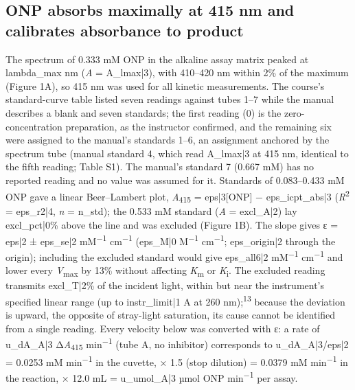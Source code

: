 \documentclass[9pt,twocolumn]{extarticle}
\newcommand{\cit}[1]{\textsuperscript{#1}}
\newcommand{\Km}{\textit{K}\textsubscript{m}}
\newcommand{\Vmax}{\textit{V}\textsubscript{max}}
\newcommand{\Ki}{\textit{K}\textsubscript{i}}
\newcommand{\Rsq}{\textit{R}\textsuperscript{2}}
\newcommand{\Aa}{\textit{A}\textsubscript{415}}
\newcommand{\dAa}{Δ\textit{A}\textsubscript{415}}
\newcommand{\permin}{min\textsuperscript{−1}}
\newcommand{\epsunits}{mM\textsuperscript{−1} cm\textsuperscript{−1}}
\newcommand{\dash}{–}
\begin{document}
\subsection{ONP absorbs maximally at 415 nm and calibrates absorbance to product}
The spectrum of 0.333 mM ONP in the alkaline assay matrix peaked at {{lambda_max}} nm (\textit{A} = {{A_lmax|3}}), with 410\dash 420 nm within 2\% of the maximum (Figure 1A), so 415 nm was used for all kinetic measurements. The course's standard-curve table listed seven readings against tubes 1\dash 7 while the manual describes a blank and seven standards; the first reading (0) is the zero-concentration preparation, as the instructor confirmed, and the remaining six were assigned to the manual's standards 1\dash 6, an assignment anchored by the spectrum tube (manual standard 4, which read {{A_lmax|3}} at 415 nm, identical to the fifth reading; Table S1). The manual's standard 7 (0.667 mM) has no reported reading and no value was assumed for it. Standards of 0.083\dash 0.433 mM ONP gave a linear Beer\dash Lambert plot, \Aa{} = {{eps|3}}[ONP] − {{eps_icpt_abs|3}} (\Rsq{} = {{eps_r2|4}}, \textit{n} = {{n_std}}); the 0.533 mM standard (\textit{A} = {{excl_A|2}}) lay {{excl_pct|0}}\% above the line and was excluded (Figure 1B). The slope gives ε = {{eps|2}} ± {{eps_se|2}} \epsunits{} ({{eps_M|0}} M\textsuperscript{−1} cm\textsuperscript{−1}; {{eps_origin|2}} through the origin); including the excluded standard would give {{eps_all6|2}} \epsunits{} and lower every \Vmax{} by 13\% without affecting \Km{} or \Ki. The excluded reading transmits {{excl_T|2}}\% of the incident light, within but near the instrument's specified linear range (up to {{instr_limit|1}} A at 260 nm);\cit{13} because the deviation is upward, the opposite of stray-light saturation, its cause cannot be identified from a single reading. Every velocity below was converted with ε: a rate of {{u_dA_A|3}} \dAa{} \permin{} (tube A, no inhibitor) corresponds to {{u_dA_A|3}}/{{eps|2}} = 0.0253 mM \permin{} in the cuvette, × 1.5 (stop dilution) = 0.0379 mM \permin{} in the reaction, × 12.0 mL = {{u_umol_A|3}} µmol ONP \permin{} per assay.
\end{document}
